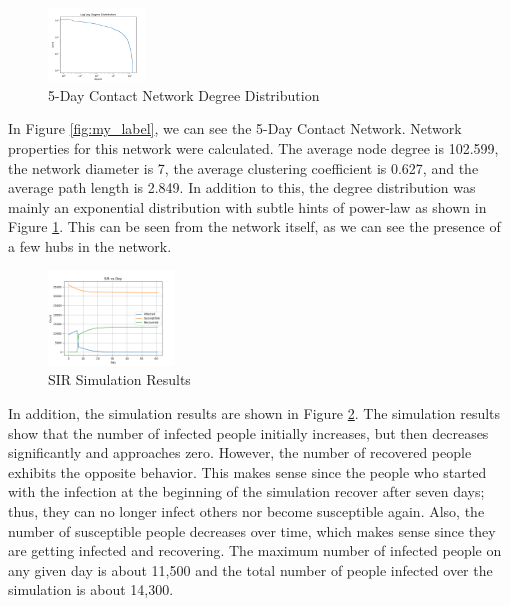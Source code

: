 \documentclass[times, 10pt,twocolumn]{article}
\begin{document}
\vspace{-15pt}
\begin{figure}[h]
    \centering
    \includegraphics[width=0.23\textwidth]{imgs/5_day_log_log_degree_distribution.png}
    \caption{5-Day Contact Network Degree Distribution}
    \label{fig:deg_dist}
\end{figure}

In Figure \ref{fig:my_label}, we can see the 5-Day Contact Network. Network properties for this network were calculated. The average node degree is 102.599, the network diameter is 7, the average clustering coefficient is 0.627, and the average path length is 2.849. In addition to this, the degree distribution was mainly an exponential distribution with subtle hints of power-law as shown in Figure \ref{fig:deg_dist}. This can be seen from the network itself, as we can see the presence of a few hubs in the network.



\begin{figure}[h]
    \centering
    \includegraphics[width=0.30\textwidth]{imgs/complete_simulation.png}
    \caption{SIR Simulation Results}
    \label{fig:simulation_results}
\end{figure}

In addition, the simulation results are shown in Figure \ref{fig:simulation_results}. The simulation results show that the number of infected people initially increases, but then decreases significantly and approaches zero. However, the number of recovered people exhibits the opposite behavior. This makes sense since the people who started with the infection at the beginning of the simulation recover after seven days; thus, they can no longer infect others nor become susceptible again. Also, the number of susceptible people decreases over time, which makes sense since they are getting infected and recovering. The maximum number of infected people on any given day is about 11,500 and the total number of people infected over the simulation is about 14,300.
\end{document}
